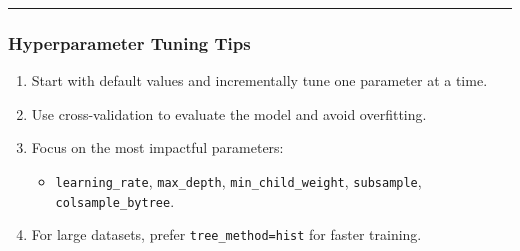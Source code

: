 \documentclass[12pt]{book}
\providecommand{\tightlist}{%
  \setlength{\itemsep}{0pt}\setlength{\parskip}{0pt}}
\begin{document}
\begin{center}\rule{0.5\linewidth}{0.5pt}\end{center}

\subsubsection{\texorpdfstring{\textbf{Hyperparameter Tuning
Tips}}{Hyperparameter Tuning Tips}}\label{hyperparameter-tuning-tips}

\begin{enumerate}
\def\labelenumi{\arabic{enumi}.}
\tightlist
\item
  Start with default values and incrementally tune one parameter at a
  time.
\item
  Use cross-validation to evaluate the model and avoid overfitting.
\item
  Focus on the most impactful parameters:

  \begin{itemize}
  \tightlist
  \item
    \texttt{learning\_rate}, \texttt{max\_depth},
    \texttt{min\_child\_weight}, \texttt{subsample},
    \texttt{colsample\_bytree}.
  \end{itemize}
\item
  For large datasets, prefer
  \texttt{tree\_method=\textquotesingle{}hist\textquotesingle{}} for
  faster training.
\end{enumerate}
\end{document}
